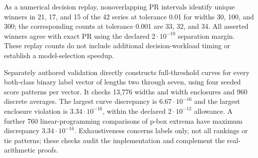 As a numerical decision replay, nonoverlapping PR intervals identify unique
winners in 21, 17, and 15 of the 42 series at tolerance 0.01 for widths
30, 100, and 300; the corresponding counts at tolerance 0.001 are 33, 32,
and 34. All asserted winners agree with exact PR using the declared
$2\cdot10^{-10}$ separation margin. These replay counts do not include
additional decision-workload timing or establish a model-selection speedup.

Separately authored validation directly constructs full-threshold curves
for every both-class binary label vector of lengths two through seven,
using four seeded score patterns per vector. It checks 13,776 widths and
width enclosures and 960 discrete averages. The largest curve discrepancy
is $6.67\cdot10^{-16}$ and the largest enclosure violation is
$3.34\cdot10^{-16}$, within the declared $2\cdot10^{-12}$ allowance.
A further 760 linear-programming comparisons of p-box extrema have maximum
discrepancy $3.34\cdot10^{-16}$. Exhaustiveness concerns labels only, not all
rankings or tie patterns; these checks audit the implementation and complement
the real-arithmetic proofs.

